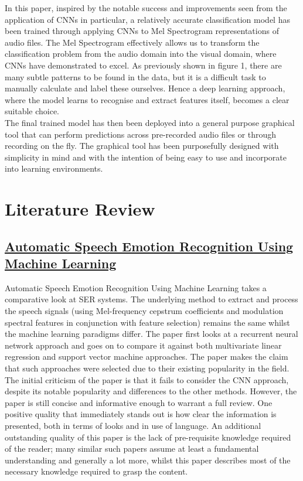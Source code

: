 \documentclass[12pt]{article}
\begin{document}
\noindent In this paper, inspired by the notable success and improvements seen from the application of CNNs in particular, a relatively accurate classification model has been trained through applying CNNs to Mel Spectrogram representations of audio files. The Mel Spectrogram effectively allows us to transform the classification problem from the audio domain into the visual domain, where CNNs have demonstrated to excel. As previously shown in figure 1, there are many subtle patterns to be found in the data, but it is a difficult task to manually calculate and label these ourselves. Hence a deep learning approach, where the model learns to recognise and extract features itself, becomes a clear suitable choice.
\\

\noindent The final trained model has then been deployed into a general purpose graphical tool that can perform predictions across pre-recorded audio files or through recording on the fly. The graphical tool has been purposefully designed with simplicity in mind and with the intention of being easy to use and incorporate into learning environments.

\section{Literature Review}

\subsection{\href{https://www.intechopen.com/books/social-media-and-machine-learning/automatic-speech-emotion-recognition-using-machine-learning}{Automatic Speech Emotion Recognition Using Machine Learning}}
Automatic Speech Emotion Recognition Using Machine Learning takes a comparative look at SER systems. The underlying method to extract and process the speech signals (using Mel-frequency cepstrum coefficients and modulation spectral features in conjunction with feature selection) remains the same whilst the machine learning paradigms differ. The paper first looks at a recurrent neural network approach and goes on to compare it against both multivariate linear regression and support vector machine approaches. The paper makes the claim that such approaches were selected due to their existing popularity in the field. 
\\

\noindent The initial criticism of the paper is that it fails to consider the CNN approach, despite its notable popularity and differences to the other methods. However, the paper is still concise and informative enough to warrant a full review. One positive quality that immediately stands out is how clear the information is presented, both in terms of looks and in use of language. An additional outstanding quality of this paper is the lack of pre-requisite knowledge required of the reader; many similar such papers assume at least a fundamental understanding and generally a lot more, whilst this paper describes most of the necessary knowledge required to grasp the content.
\\
\end{document}
